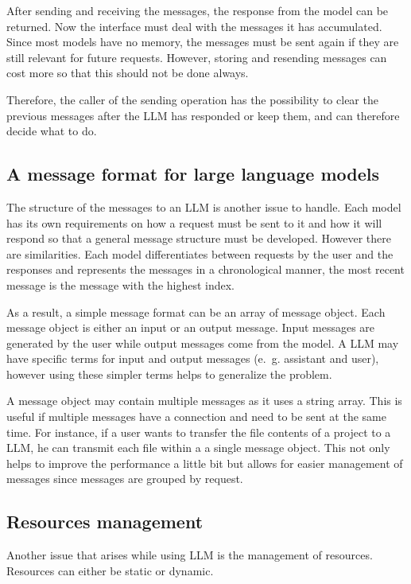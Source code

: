 After sending and receiving the messages, the response from the model can be returned. Now the interface must deal with the messages it has accumulated. Since most models have no memory, the messages must be sent again if they are still relevant for future requests. However, storing and resending messages can cost more so that this should not be done always.

Therefore, the caller of the sending operation has the possibility to clear the previous messages after the \ac{LLM} has responded or keep them, and can therefore decide what to do.

\subsection{A message format for large language models} \label{sec:llm_msg_structure}
The structure of the messages to an \ac{LLM} is another issue to handle. Each model has its own requirements on how a request must be sent to it and how it will respond so that a general message structure must be developed. However there are similarities. Each model differentiates between requests by the user and the responses and represents the messages in a chronological manner, the most recent message is the message with the highest index. 

As a result, a simple message format can be an array of message object. Each message object is either an input or an output message. Input messages are generated by the user while output messages come from the model. A \ac{LLM} may have specific terms for input and output messages (e.~g. assistant and user), however using these simpler terms helps to generalize the problem.

A message object may contain multiple messages as it uses a string array. This is useful if multiple messages have a connection and need to be sent at the same time. For instance, if a user wants to transfer the file contents of a project to a \ac{LLM}, he can transmit each file within a a single message object. This not only helps to improve the performance a little bit but allows for easier management of messages since messages are grouped by request. 

\subsection{Resources management}\label{llm_msg_storage}

Another issue that arises while using \ac{LLM} is the management of resources. Resources can either be static or dynamic. 

